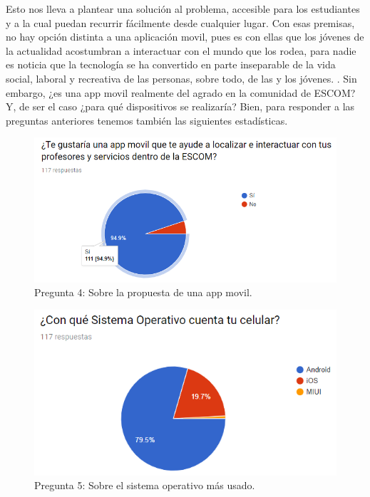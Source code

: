 \noindent
Esto nos lleva a plantear una solución al problema, accesible para los estudiantes y a la cual puedan
recurrir fácilmente desde cualquier lugar. Con esas premisas, no hay opción distinta a una aplicación movil,
pues es con ellas que los jóvenes de la actualidad acostumbran a interactuar con el mundo que los rodea, para
nadie es noticia que la tecnología se ha convertido en parte inseparable de la vida social, laboral y 
recreativa de las personas, sobre todo, de las y los jóvenes. \cite{jovenes_tecnologia}. Sin embargo, ¿es una
app movil realmente del agrado en la comunidad de ESCOM? Y, de ser el caso ¿para qué dispositivos se realizaría?
Bien, para responder a las preguntas anteriores tenemos también las siguientes estadísticas. 

\begin{figure}[htbp!]
	\centering
	\includegraphics[width=1\textwidth]{intro/images_justificacion/encuesta_agreeApp}
	\caption{Pregunta 4: Sobre la propuesta de una app movil.}
\end{figure}

\pagebreak
\begin{figure}[htbp!]
	\centering
	\includegraphics[width=1\textwidth]{intro/images_justificacion/encuesta_so}
	\caption{Pregunta 5: Sobre el sistema operativo más usado.}
\end{figure}

